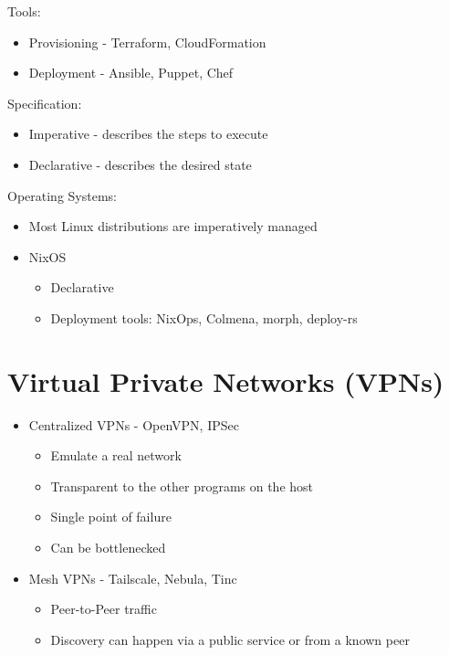 Tools:

\begin{itemize}
\tightlist
\item
  Provisioning - Terraform, CloudFormation
\item
  Deployment - Ansible, Puppet, Chef
\end{itemize}

Specification:

\begin{itemize}
\tightlist
\item
  Imperative - describes the steps to execute
\item
  Declarative - describes the desired state
\end{itemize}

Operating Systems:

\begin{itemize}
\tightlist
\item
  Most Linux distributions are imperatively managed
\item
  NixOS

  \begin{itemize}
  \tightlist
  \item
    Declarative
  \item
    Deployment tools: NixOps, Colmena, morph, deploy-rs
  \end{itemize}
\end{itemize}

\hypertarget{virtual-private-networks-vpns}{%
\chapter{Virtual Private Networks
(VPNs)}\label{virtual-private-networks-vpns}}

\begin{itemize}
\tightlist
\item
  Centralized VPNs - OpenVPN, IPSec

  \begin{itemize}
  \tightlist
  \item
    Emulate a real network
  \item
    Transparent to the other programs on the host
  \item
    Single point of failure
  \item
    Can be bottlenecked
  \end{itemize}
\item
  Mesh VPNs - Tailscale, Nebula, Tinc

  \begin{itemize}
  \tightlist
  \item
    Peer-to-Peer traffic
  \item
    Discovery can happen via a public service or from a known peer
  \end{itemize}
\end{itemize}


